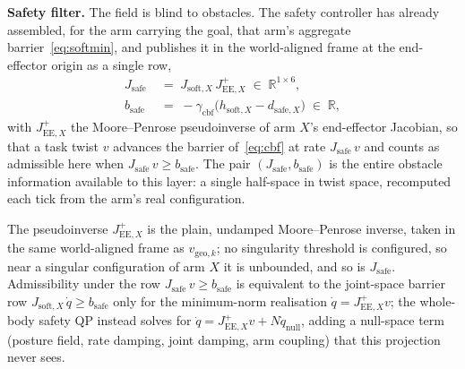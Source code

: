 \textbf{Safety filter.} The field is blind to obstacles. The safety controller has already assembled, for the arm carrying the goal, that arm's aggregate barrier~\eqref{eq:softmin}, and publishes it in the world-aligned frame at the end-effector origin as a single row,
\begin{equation}
\begin{split}
J_{\text{safe}} &\;=\; J_{\text{soft},X}\,J_{\text{EE},X}^{+} \;\in\; \mathbb{R}^{1\times 6}, \\
b_{\text{safe}} &\;=\; -\gamma_{\text{cbf}}\bigl(h_{\text{soft},X} - d_{\text{safe},X}\bigr) \;\in\; \mathbb{R},
\end{split}
\label{eq:jsafe}
\end{equation}
with $J_{\text{EE},X}^{+}$ the Moore--Penrose pseudoinverse of arm $X$'s end-effector Jacobian, so that a task twist $v$ advances the barrier of~\eqref{eq:cbf} at rate $J_{\text{safe}}\,v$ and counts as admissible here when $J_{\text{safe}}\,v \ge b_{\text{safe}}$. The pair $(J_{\text{safe}}, b_{\text{safe}})$ is the entire obstacle information available to this layer: a single half-space in twist space, recomputed each tick from the arm's real configuration.

The pseudoinverse $J_{\text{EE},X}^{+}$ is the plain, undamped Moore--Penrose inverse, taken in the same world-aligned frame as $v_{\text{geo},k}$; no singularity threshold is configured, so near a singular configuration of arm $X$ it is unbounded, and so is $J_{\text{safe}}$. Admissibility under the row $J_{\text{safe}}\,v \ge b_{\text{safe}}$ is equivalent to the joint-space barrier row $J_{\text{soft},X}\,\dot{q} \ge b_{\text{safe}}$ only for the minimum-norm realisation $\dot{q} = J_{\text{EE},X}^{+}v$; the whole-body safety QP instead solves for $\dot{q} = J_{\text{EE},X}^{+}v + N\dot{q}_{\text{null}}$, adding a null-space term (posture field, rate damping, joint damping, arm coupling) that this projection never sees.

